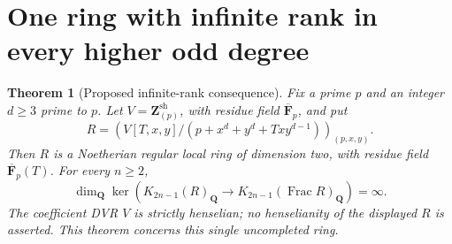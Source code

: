 \documentclass[11pt,a4paper]{article}
\newtheorem{theorem}{Theorem}[section]
\theoremstyle{remark}
\newcommand{\Z}{\mathbf Z}
\newcommand{\Q}{\mathbf Q}
\newcommand{\F}{\mathbf F}
\newcommand{\Frac}{\operatorname{Frac}}
\begin{document}
\section{One ring with infinite rank in every higher odd degree}
\label{sec:twodimstrictcoefficientinfinite}

\begin{theorem}[Proposed infinite-rank consequence]
\label{thm:twodimstrictcoefficientinfinite}
Fix a prime $p$ and an integer $d\ge3$ prime to $p$. Let
$V=\Z_{(p)}^{\mathrm{sh}}$, with residue field $\overline{\F}_p$,
and put
\[
 R=\left(V[T,x,y]/(p+x^d+y^d+Txy^{d-1})\right)_{(p,x,y)}.
\]
Then $R$ is a Noetherian regular local ring of dimension two,
with residue field $\overline{\F}_p(T)$. For every $n\ge2$,
\[
 \dim_{\Q}\ker\!\left(K_{2n-1}(R)_{\Q}
       \longrightarrow K_{2n-1}(\Frac R)_{\Q}\right)=\infty.
\]
The coefficient DVR $V$ is strictly henselian; no henselianity
of the displayed $R$ is asserted. This theorem concerns this
single uncompleted ring.
\end{theorem}
\end{document}
